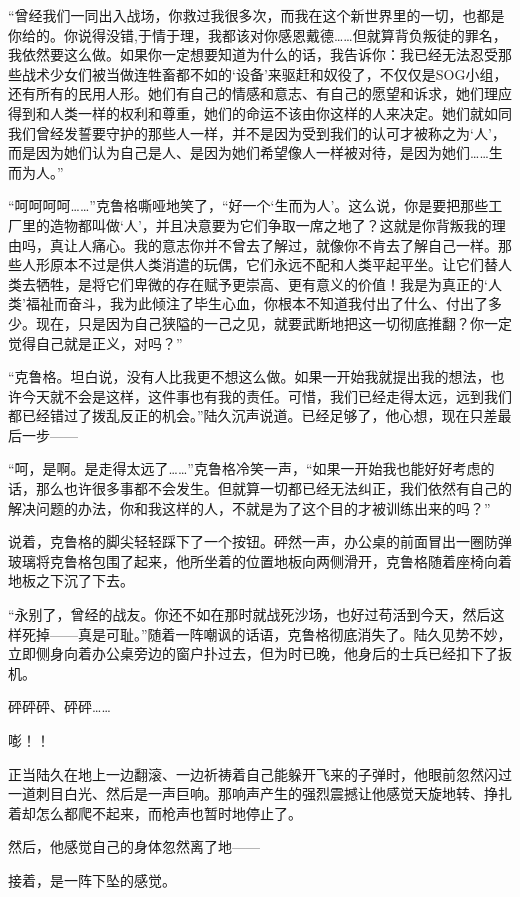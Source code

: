 “曾经我们一同出入战场，你救过我很多次，而我在这个新世界里的一切，也都是你给的。你说得没错,于情于理，我都该对你感恩戴德……但就算背负叛徒的罪名，我依然要这么做。如果你一定想要知道为什么的话，我告诉你：我已经无法忍受那些战术少女们被当做连牲畜都不如的‘设备’来驱赶和奴役了，不仅仅是SOG小组，还有所有的民用人形。她们有自己的情感和意志、有自己的愿望和诉求，她们理应得到和人类一样的权利和尊重，她们的命运不该由你这样的人来决定。她们就如同我们曾经发誓要守护的那些人一样，并不是因为受到我们的认可才被称之为‘人’，而是因为她们认为自己是人、是因为她们希望像人一样被对待，是因为她们……生而为人。”

“呵呵呵呵……”克鲁格嘶哑地笑了，“好一个‘生而为人’。这么说，你是要把那些工厂里的造物都叫做‘人’，并且决意要为它们争取一席之地了？这就是你背叛我的理由吗，真让人痛心。我的意志你并不曾去了解过，就像你不肯去了解自己一样。那些人形原本不过是供人类消遣的玩偶，它们永远不配和人类平起平坐。让它们替人类去牺牲，是将它们卑微的存在赋予更崇高、更有意义的价值！我是为真正的‘人类’福祉而奋斗，我为此倾注了毕生心血，你根本不知道我付出了什么、付出了多少。现在，只是因为自己狭隘的一己之见，就要武断地把这一切彻底推翻？你一定觉得自己就是正义，对吗？”

“克鲁格。坦白说，没有人比我更不想这么做。如果一开始我就提出我的想法，也许今天就不会是这样，这件事也有我的责任。可惜，我们已经走得太远，远到我们都已经错过了拨乱反正的机会。”陆久沉声说道。已经足够了，他心想，现在只差最后一步——

“呵，是啊。是走得太远了……”克鲁格冷笑一声，“如果一开始我也能好好考虑的话，那么也许很多事都不会发生。但就算一切都已经无法纠正，我们依然有自己的解决问题的办法，你和我这样的人，不就是为了这个目的才被训练出来的吗？”

说着，克鲁格的脚尖轻轻踩下了一个按钮。砰然一声，办公桌的前面冒出一圈防弹玻璃将克鲁格包围了起来，他所坐着的位置地板向两侧滑开，克鲁格随着座椅向着地板之下沉了下去。

“永别了，曾经的战友。你还不如在那时就战死沙场，也好过苟活到今天，然后这样死掉——真是可耻。”随着一阵嘲讽的话语，克鲁格彻底消失了。陆久见势不妙，立即侧身向着办公桌旁边的窗户扑过去，但为时已晚，他身后的士兵已经扣下了扳机。

砰砰砰、砰砰……

嘭！！

正当陆久在地上一边翻滚、一边祈祷着自己能躲开飞来的子弹时，他眼前忽然闪过一道刺目白光、然后是一声巨响。那响声产生的强烈震撼让他感觉天旋地转、挣扎着却怎么都爬不起来，而枪声也暂时地停止了。

然后，他感觉自己的身体忽然离了地——

接着，是一阵下坠的感觉。


